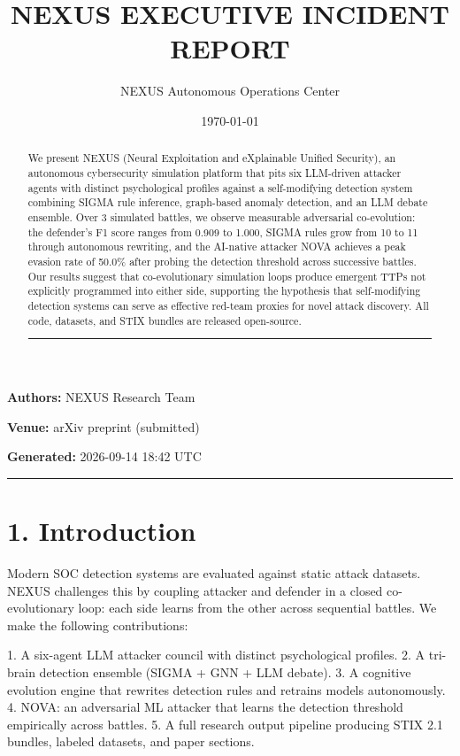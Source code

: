 \documentclass{article}
\title{NEXUS EXECUTIVE INCIDENT REPORT}
\author{NEXUS Autonomous Operations Center}
\date{\today}
\begin{document}
\maketitle


\textbf{Authors:} NEXUS Research Team  

\textbf{Venue:} arXiv preprint (submitted)  

\textbf{Generated:} 2026-09-14 18:42 UTC  

\hrule\vspace{6pt}

\begin{abstract}

We present NEXUS (Neural Exploitation and eXplainable Unified Security), an autonomous cybersecurity simulation platform that pits six LLM-driven attacker agents with distinct psychological profiles against a self-modifying detection system combining SIGMA rule inference, graph-based anomaly detection, and an LLM debate ensemble. Over 3 simulated battles, we observe measurable adversarial co-evolution: the defender's F1 score ranges from 0.909 to 1.000, SIGMA rules grow from 10 to 11 through autonomous rewriting, and the AI-native attacker NOVA achieves a peak evasion rate of 50.0\% after probing the detection threshold across successive battles. Our results suggest that co-evolutionary simulation loops produce emergent TTPs not explicitly programmed into either side, supporting the hypothesis that self-modifying detection systems can serve as effective red-team proxies for novel attack discovery. All code, datasets, and STIX bundles are released open-source.


\hrule\vspace{6pt}

\end{abstract}

\section{1. Introduction}

Modern SOC detection systems are evaluated against static attack datasets. NEXUS challenges this by coupling attacker and defender in a closed co-evolutionary loop: each side learns from the other across sequential battles. We make the following contributions:

1. A six-agent LLM attacker council with distinct psychological profiles.
2. A tri-brain detection ensemble (SIGMA + GNN + LLM debate).
3. A cognitive evolution engine that rewrites detection rules and retrains models autonomously.
4. NOVA: an adversarial ML attacker that learns the detection threshold empirically across battles.
5. A full research output pipeline producing STIX 2.1 bundles, labeled datasets, and paper sections.
\end{document}

